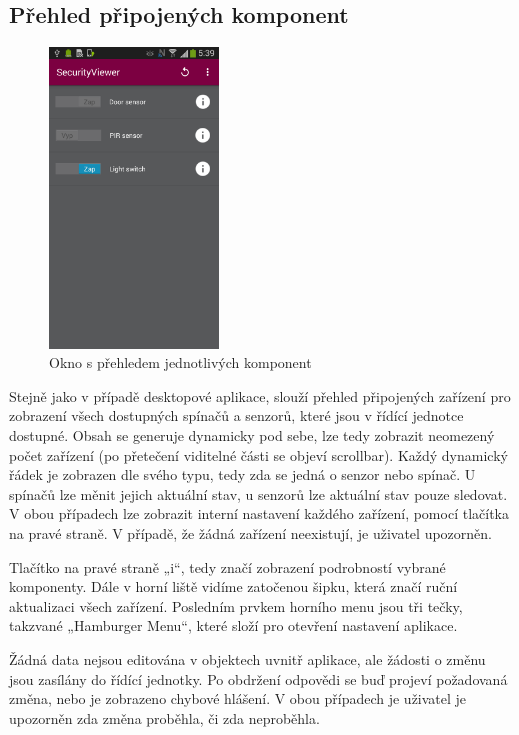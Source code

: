 \documentclass[FM,DP]{tulthesis}  %
\begin{document}
\subsection{Přehled připojených komponent}
\begin{figure}[H]
\begin{center}
\includegraphics[width=0.4\textwidth]{images/app1.png}
\caption{Okno s přehledem jednotlivých komponent}
\label{image}
\end{center}
\end{figure}

Stejně jako v případě desktopové aplikace, slouží přehled připojených zařízení pro zobrazení všech dostupných spínačů a senzorů, které jsou v řídící jednotce dostupné. Obsah se generuje dynamicky pod sebe, lze tedy zobrazit neomezený počet zařízení (po přetečení viditelné části se objeví scrollbar). Každý dynamický řádek je zobrazen dle svého typu, tedy zda se jedná o senzor nebo spínač. U spínačů lze měnit jejich aktuální stav, u senzorů lze aktuální stav pouze sledovat. V obou případech lze zobrazit interní nastavení každého zařízení, pomocí tlačítka na pravé straně. V případě, že žádná zařízení neexistují, je uživatel upozorněn.

Tlačítko na pravé straně „i“, tedy značí zobrazení podrobností vybrané komponenty. Dále v horní liště vidíme zatočenou šipku, která značí ruční aktualizaci všech zařízení. Posledním prvkem horního menu jsou tři tečky, takzvané „Hamburger Menu“, které složí pro otevření nastavení aplikace.

Žádná data nejsou editována v objektech uvnitř aplikace, ale žádosti o změnu jsou zasílány do řídící jednotky. Po obdržení odpovědi se buď projeví požadovaná změna, nebo je zobrazeno chybové hlášení. V obou případech je uživatel je upozorněn zda změna proběhla, či zda neproběhla.
\end{document}
